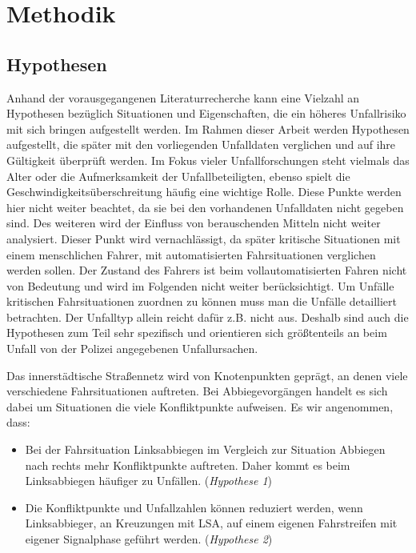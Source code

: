 
\chapter{Methodik}\label{chapter:Methodik}

\section{Hypothesen}\label{section:Hypothesen} %

Anhand der vorausgegangenen Literaturrecherche kann eine Vielzahl an Hypothesen bezüglich Situationen und Eigenschaften, die ein höheres Unfallrisiko mit sich bringen aufgestellt werden. Im Rahmen dieser Arbeit werden Hypothesen aufgestellt, die später mit den vorliegenden Unfalldaten verglichen und auf ihre Gültigkeit überprüft werden. Im Fokus vieler Unfallforschungen steht vielmals das Alter oder die Aufmerksamkeit der Unfallbeteiligten, ebenso spielt die Geschwindigkeitsüberschreitung häufig eine wichtige Rolle. Diese Punkte werden hier nicht weiter beachtet, da sie bei den vorhandenen Unfalldaten nicht gegeben sind. Des weiteren wird der Einfluss von berauschenden Mitteln nicht weiter analysiert. Dieser Punkt wird vernachlässigt, da später kritische Situationen mit einem menschlichen Fahrer, mit automatisierten Fahrsituationen verglichen werden sollen. Der Zustand des Fahrers ist beim vollautomatisierten Fahren nicht von Bedeutung und wird im Folgenden nicht weiter berücksichtigt. Um Unfälle kritischen Fahrsituationen zuordnen zu können muss man die Unfälle detailliert betrachten. Der Unfalltyp allein reicht dafür z.B. nicht aus. Deshalb sind auch die Hypothesen zum Teil sehr spezifisch und orientieren sich größtenteils an beim Unfall von der Polizei angegebenen Unfallursachen.

Das innerstädtische Straßennetz wird von Knotenpunkten geprägt, an denen viele verschiedene Fahrsituationen auftreten. Bei Abbiegevorgängen handelt es sich dabei um Situationen die viele Konfliktpunkte aufweisen. Es wir angenommen, dass:

\begin{itemize}
	\item Bei der Fahrsituation Linksabbiegen im Vergleich zur Situation Abbiegen nach rechts mehr Konfliktpunkte auftreten. Daher kommt es beim Linksabbiegen häufiger zu Unfällen. (\textit{Hypothese 1})
	\item Die Konfliktpunkte und Unfallzahlen können reduziert werden, wenn Linksabbieger, an Kreuzungen mit LSA, auf einem eigenen Fahrstreifen mit eigener Signalphase geführt werden. (\textit{Hypothese 2})
\end{itemize}

